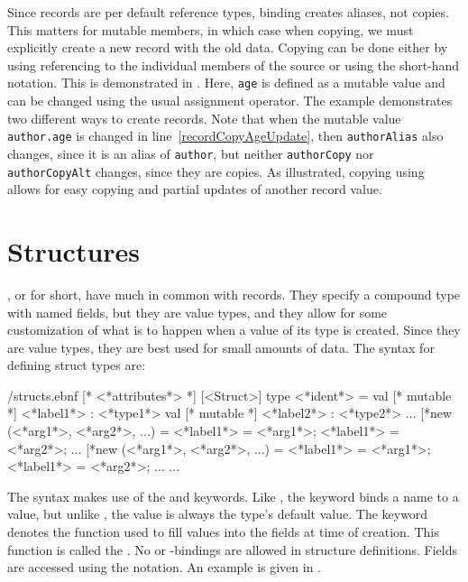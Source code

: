 \documentclass[fsharpnotes.tex]{subfiles}
\begin{document}
Since records are per default reference types, binding creates aliases, not copies. This matters for mutable members, in which case when copying, we must explicitly create a new record with the old data. Copying can be done either by using referencing to the individual members of the source or using the short-hand  notation. This is demonstrated in .
%
%
Here, \lstinline{age} is defined as a mutable value and can be changed using the usual \lexeme{<-} assignment operator. The example demonstrates two different ways to create records. Note that when the mutable value \lstinline{author.age} is changed in line~\ref{recordCopyAgeUpdate}, then \lstinline{authorAlias} also changes, since it is an alias of \lstinline{author}, but neither \lstinline{authorCopy} nor \lstinline{authorCopyAlt} changes, since they are copies. As illustrated, copying using  allows for easy copying and partial updates of another record value.
\clearpage

\section{Structures}
\label{sec:structs}
, or  for short, have much in common with records. They specify a compound type with named fields, but they are value types, and they allow for some customization of what is to happen when a value of its type is created. Since they are value types, they are best used for small amounts of data. The syntax for defining struct types are:
%
\begin{verbatimwrite}{\ebnf/structs.ebnf}
[* <*attributes*> *] 
[<Struct>] 
type <*ident*> =
  val [* mutable *] <*label1*> : <*type1*>
  val [* mutable *] <*label2*> : <*type2*>
  ...
  [*new (<*arg1*>, <*arg2*>, ...) = {<*label1*> = <*arg1*>; <*label1*> = <*arg2*>; ...}
  [*new (<*arg1*>, <*arg2*>, ...) = {<*label1*> = <*arg1*>; <*label1*> = <*arg2*>; ...}
  ...
\end{verbatimwrite}
%
The syntax makes use of the  and  keywords. Like , the keyword  binds a name to a value, but unlike , the value is always the type's default value. The  keyword denotes the function used to fill values into the fields at time of creation. This function is called the . No  or -bindings are allowed in structure definitions. Fields are accessed using the  notation. An example is given in .
%
%
\end{document}
